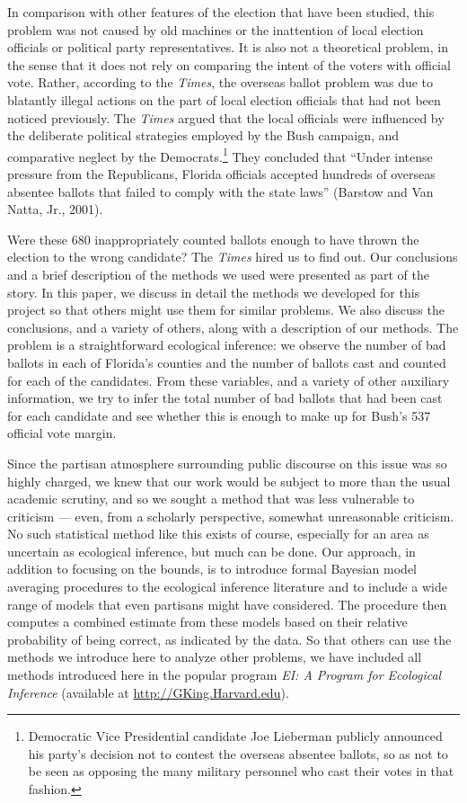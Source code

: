 \documentclass[11pt,titlepage]{article}
\begin{document}
In comparison with other features of the election that have been
studied, this problem was not caused by old machines or the
inattention of local election officials or political party
representatives.  It is also not a theoretical problem, in the sense
that it does not rely on comparing the intent of the voters with
official vote.  Rather, according to the \emph{Times}, the overseas
ballot problem was due to blatantly illegal actions on the part of
local election officials that had not been noticed previously.  The
\emph{Times} argued that the local officials were influenced by the
deliberate political strategies employed by the Bush campaign, and
comparative neglect by the Democrats.\footnote{Democratic Vice
  Presidential candidate Joe Lieberman publicly announced his party's
  decision not to contest the overseas absentee ballots, so as not to
  be seen as opposing the many military personnel who cast their votes
  in that fashion.}  They concluded that ``Under intense pressure from
the Republicans, Florida officials accepted hundreds of overseas
absentee ballots that failed to comply with the state laws'' (Barstow
and Van Natta, Jr., 2001)\nocite{BarVan01}.

Were these 680 inappropriately counted ballots enough to have thrown
the election to the wrong candidate?  The \emph{Times} hired us to
find out.  Our conclusions and a brief description of the methods we
used were presented as part of the story.  In this paper, we discuss
in detail the methods we developed for this project so that others
might use them for similar problems.  We also discuss the conclusions,
and a variety of others, along with a description of our methods.  The
problem is a straightforward ecological inference: we observe the
number of bad ballots in each of Florida's counties and the number of
ballots cast and counted for each of the candidates.  From these
variables, and a variety of other auxiliary information, we try to
infer the total number of bad ballots that had been cast for each
candidate and see whether this is enough to make up for Bush's 537
official vote margin.

Since the partisan atmosphere surrounding public discourse on this
issue was so highly charged, we knew that our work would be subject to
more than the usual academic scrutiny, and so we sought a method that
was less vulnerable to criticism --- even, from a scholarly
perspective, somewhat unreasonable criticism.  No such statistical
method like this exists of course, especially for an area as uncertain
as ecological inference, but much can be done.  Our approach, in
addition to focusing on the bounds, is to introduce formal Bayesian
model averaging procedures to the ecological inference literature and
to include a wide range of models that even partisans might have
considered.  The procedure then computes a combined estimate from
these models based on their relative probability of being correct, as
indicated by the data.  So that others can use the methods we
introduce here to analyze other problems, we have included all methods
introduced here in the popular program \emph{EI: A Program for
  Ecological Inference} (available at \url{http://GKing.Harvard.edu}).
\end{document}
